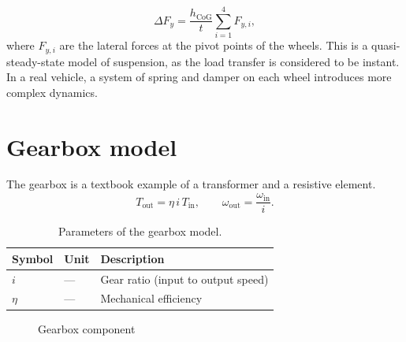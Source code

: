 \begin{equation}
    \Delta F_y = \frac{h_\text{CoG}}{t}\sum_{i=1}^{4} F_{y,i},
    \label{eq:lateral_transfer_tires}
\end{equation}
where $F_{y,i}$ are the lateral forces at the pivot points of the wheels. This is a quasi-steady-state model of suspension, as the load transfer is considered to be instant. In a real vehicle, a system of spring and damper on each wheel introduces more complex dynamics.
\section{Gearbox model}
The gearbox is a textbook example of a transformer and a resistive element.
\begin{equation}
    T_\text{out} = \eta\, i\, T_\text{in}, \qquad
    \omega_\text{out} = \frac{\omega_\text{in}}{i}.
\end{equation}

\begin{table}[!ht]
    \centering
    \begin{tabular}{lll}
        \hline
        \textbf{Symbol} & \textbf{Unit} & \textbf{Description} \\
        \hline
        $i$    & ---  & Gear ratio (input to output speed) \\
        $\eta$ & ---  & Mechanical efficiency \\
        \hline
    \end{tabular}
    \caption{Parameters of the gearbox model.}\label{tab:gearbox-params}
\end{table}

\begin{figure}[H]
    \centering
    \caption{Gearbox component}\label{fig:gearbox}
\end{figure}

